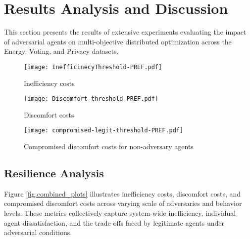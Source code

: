 \documentclass[journal]{IEEEtran}
\begin{document}
\section{Results Analysis and Discussion} \label{sec5}
This section presents the results of extensive experiments evaluating the impact of adversarial agents on multi-objective distributed optimization across the Energy, Voting, and Privacy datasets.


\begin{figure*}[htbp]
  \centering
  \begin{subfigure}{\textwidth}
    \centering
    \texttt{[image: InefficinecyThreshold-PREF.pdf]}
    \caption{Inefficiency costs}
    \label{fig:inefficinecy}
  \end{subfigure}

  \begin{subfigure}{\textwidth}
    \centering
    \texttt{[image: Discomfort-threshold-PREF.pdf]}
    \caption{Discomfort costs}
    \label{fig:discomfort}
  \end{subfigure}

  \begin{subfigure}{\textwidth}
    \centering
    \texttt{[image: compromised-legit-threshold-PREF.pdf]}
    \caption{Compromised discomfort costs for non-adversary agents}
    \label{fig:compromised}
  \end{subfigure}
    \caption{Multi-objective optimization performance across different numbers of adversary agents and various levels of adversaries within the Energy, Voting, and Privacy datasets. R, V, and C indicate regions of Resilience, Vulnerability, and Collapse.}
  \label{fig:combined_plots}
\end{figure*}

\subsection{Resilience Analysis}
Figure \ref{fig:combined_plots} illustrates inefficiency costs, discomfort costs, and compromised discomfort costs across varying scale of adversaries and behavior levels. These metrics collectively capture system-wide inefficiency, individual agent dissatisfaction, and the trade-offs faced by legitimate agents under adversarial conditions.
\end{document}
